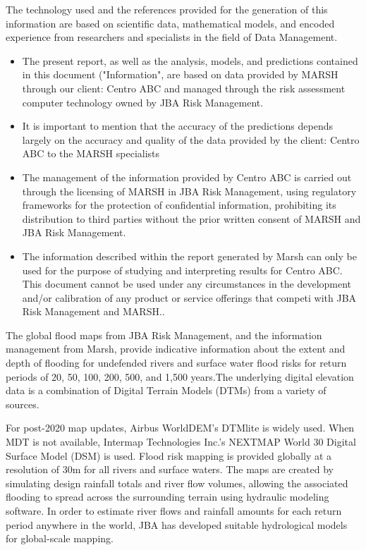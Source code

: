 \documentclass[
]{article}
\begin{document}
\noindent \fontsize{11}{13}\selectfont The technology used and the
references provided for the generation of this information are based on
scientific data, mathematical models, and encoded experience from
researchers and specialists in the field of Data Management.

\begin{itemize}
  \item {\fontsize{11}{13}\selectfont The present report, as well as the analysis, models,    and predictions contained in this document ("Information", are based on data provided by    MARSH through our client: Centro ABC and managed through the risk         assessment computer technology owned by JBA Risk Management.}
  \item {\fontsize{11}{13}\selectfont It is important to mention that the accuracy of the     predictions depends largely on the accuracy and quality of the data provided by the         client: Centro ABC to the MARSH specialists}
  \item {\fontsize{11}{13}\selectfont The management of the information provided by Centro ABC is carried out through the licensing of MARSH in JBA Risk             Management, using regulatory frameworks for the protection of confidential information,     prohibiting its distribution to third parties without the prior written consent of MARSH    and JBA Risk Management.}
  \item {\fontsize{11}{13}\selectfont The information described within the report generated   by Marsh can only be used for the purpose of studying and interpreting results for Centro ABC. This document cannot be used under any circumstances in the          development and/or calibration of any product or service offerings that competi with JBA    Risk Management and MARSH..}
\end{itemize}

\fontsize{11}{13}\selectfont The global flood maps from JBA Risk
Management, and the information management from Marsh, provide
indicative information about the extent and depth of flooding for
undefended rivers and surface water flood risks for return periods of
20, 50, 100, 200, 500, and 1,500 years.The underlying digital elevation
data is a combination of Digital Terrain Models (DTMs) from a variety of
sources.

\fontsize{11}{13}\selectfont For post-2020 map updates, Airbus
WorldDEM's DTMlite is widely used. When MDT is not available, Intermap
Technologies Inc.'s NEXTMAP World 30 Digital Surface Model (DSM) is
used. Flood risk mapping is provided globally at a resolution of 30m for
all rivers and surface waters. The maps are created by simulating design
rainfall totals and river flow volumes, allowing the associated flooding
to spread across the surrounding terrain using hydraulic modeling
software. In order to estimate river flows and rainfall amounts for each
return period anywhere in the world, JBA has developed suitable
hydrological models for global-scale mapping.
\end{document}

